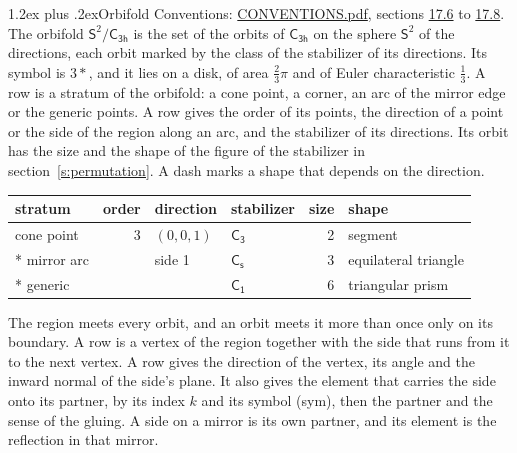 \documentclass[10pt,a4paper]{article}
\makeatletter
\renewcommand\section{\@startsection{section}{1}{\z@}{-3ex plus -1ex minus -.2ex}%
  {1.2ex plus .2ex}{\normalfont\large\sffamily\bfseries\color{parttitle}}}
\numberwithin{equation}{section}
\newcommand{\grp}[1]{\mathsf{#1}}
\newcommand{\orbname}[1]{#1}
\newcommand{\dirvec}[3]{(#1, #2, #3)}
\newcommand{\twosphere}{\mathsf{S}^{2}}
\makeatother
\begin{document}
\section{Orbifold}\label{s:orbifold}
Conventions: \href{../../CONVENTIONS.pdf}{CONVENTIONS.pdf}, sections \href{../../CONVENTIONS.pdf\#conv.17.6}{17.6} to \href{../../CONVENTIONS.pdf\#conv.17.8}{17.8}.
The orbifold $\twosphere/\grp{C_{3h}}$ is the set of the orbits of $\grp{C_{3h}}$ on the sphere $\twosphere$ of the directions, each orbit marked by the class of the stabilizer of its directions. Its symbol is $\orbname{3{\ast}}$, and it lies on a disk, of area $\tfrac{2}{3}\pi$ and of Euler characteristic $\tfrac{1}{3}$.
\leavevmode\label{n:head.stratum}\label{n:head.order.point}\label{n:head.direction}\label{n:head.stabilizer}\label{n:head.size.orbit}\label{n:head.shape}A row is a stratum of the orbifold: a cone point, a corner, an arc of the mirror edge or the generic points. A row gives the order of its points, the direction of a point or the side of the region along an arc, and the stabilizer of its directions. Its orbit has the size and the shape of the figure of the stabilizer in section~\ref{s:permutation}. A dash marks a shape that depends on the direction.
{\small\setlength{\tabcolsep}{4pt}\begin{longtable}{@{}lrllrl@{}}\toprule
stratum & order & direction & stabilizer & size & shape\\\midrule\endhead
\bottomrule\endfoot\endlastfoot
cone point & 3 & $\dirvec{0}{0}{1}$ & \href{C3.pdf}{$\grp{C_{3}}$} & 2 & segment\\*
mirror arc &  & side 1 & \href{C1v.pdf}{$\grp{C_{s}}$} & 3 & equilateral triangle\\*
generic &  &  & \href{C1.pdf}{$\grp{C_{1}}$} & 6 & triangular prism\\
\bottomrule\end{longtable}}
\leavevmode\label{n:head.vertex.region}\label{n:head.angle}\label{n:head.normal.side}\label{n:head.partner}\label{n:head.sense}The region meets every orbit, and an orbit meets it more than once only on its boundary. A row is a vertex of the region together with the side that runs from it to the next vertex. A row gives the direction of the vertex, its angle and the inward normal of the side's plane. It also gives the element that carries the side onto its partner, by its index $k$ and its symbol (sym), then the partner and the sense of the gluing. A side on a mirror is its own partner, and its element is the reflection in that mirror.
\end{document}
